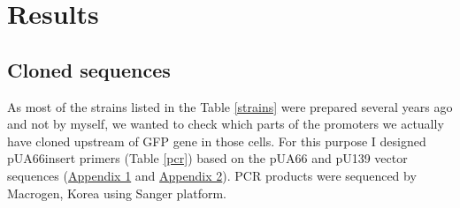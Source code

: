 \chapter{Results}

\shorthandoff{-} 

\section{Cloned  sequences}
As most of the strains listed in the Table \ref{strains} were prepared several years ago and not by myself, we wanted to check which parts of the promoters we actually have cloned upstream of GFP gene in those cells.
For this purpose I designed pUA66\textunderscore insert primers (Table \ref{pcr}) based on the pUA66 and pU139 vector sequences (\hyperlink{pUA66seq}{Appendix 1} and \hyperlink{pUA66seq}{Appendix 2}).
PCR products were sequenced by Macrogen, Korea using Sanger platform.

